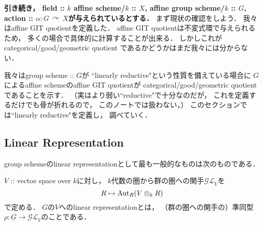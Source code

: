 \documentclass[a4paper]{jsarticle}
\newcommand{\Sch}{\mathbf{Sch}}
\newcommand{\func}[1]{\underline{#1}}
\newcommand{\ftorGL}{\mathcal{GL}}
\newcommand{\acton}{\,\curvearrowright\,}
\begin{document}
    \textbf
    {
    引き続き，
    field :: $k$
    affine scheme/$k$ :: $X$,
    affine group scheme/$k$ :: $G$,
    action :: $\alpha: G \acton X$が与えられているとする．
    }
    まず現状の確認をしよう．
    我々はaffine GIT quotientを定義した．
    affine GIT quotientは不変式環で与えられるため，
    多くの場合で具体的に計算することが出来る．
    しかしこれがcategorical/good/geometric quotient
    であるかどうかはまだ我々には分からない．
    
    我々はgroup scheme :: $G$が
    ``linearly reductive"という性質を備えている場合に
    $G$によるaffine schemeのaffine GIT quotientが
    categorical/good/geometric quotientであることを示す．
    （実はより弱い``reductive"で十分なのだが，
    これを定義するだけでも骨が折れるので，
    このノートでは扱わない，）
    このセクションでは``linearly reductive"を定義し，
    調べていく．

    \subsection{Linear Representation} 
    group schemeのlinear representationとして最も一般的なものは次のものである．
    \begin{Def}
        $V$ :: vectoe space over $k$に対し，
        $k$代数の圏から群の圏への関手$\ftorGL_V$を
        \[ R \mapsto \operatorname{Aut}_R(V \otimes_k R) \]
        で定める．
        $G$の$V$へのlinear representationとは，
        （群の圏への関手の）準同型$\rho: \func{G} \to \ftorGL_V$のことである．
    \end{Def}
\end{document}
